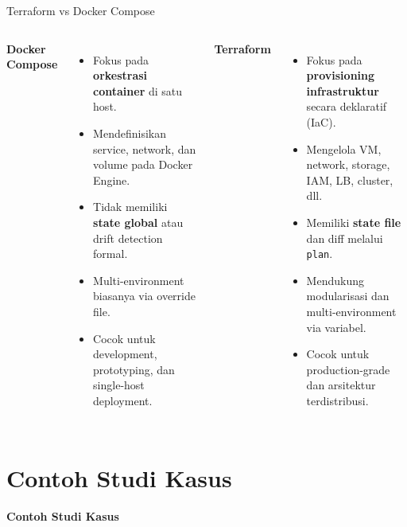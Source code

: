 \documentclass[aspectratio=169, table]{beamer}
\begin{document}
\begin{frame}{Terraform vs Docker Compose}
	\vspace{4pt}
	\begin{columns}[T]
		\textbf{Docker Compose}
		\begin{itemize}
			\item Fokus pada \textbf{orkestrasi container} di satu host.
			\item Mendefinisikan service, network, dan volume pada Docker Engine.
			\item Tidak memiliki \textbf{state global} atau drift detection formal.
			\item Multi-environment biasanya via override file.
			\item Cocok untuk development, prototyping, dan single-host deployment.
		\end{itemize}

		\textbf{Terraform}
		\begin{itemize}
			\item Fokus pada \textbf{provisioning infrastruktur} secara deklaratif (IaC).
			\item Mengelola VM, network, storage, IAM, LB, cluster, dll.
			\item Memiliki \textbf{state file} dan diff melalui \texttt{plan}.
			\item Mendukung modularisasi dan multi-environment via variabel.
			\item Cocok untuk production-grade dan arsitektur terdistribusi.
		\end{itemize}
	\end{columns}
\end{frame}


\section{Contoh Studi Kasus}

	\begin{frame}{\hfill}
		\centering
		\Huge{\textbf{Contoh Studi Kasus}}
	\end{frame}
\end{document}
